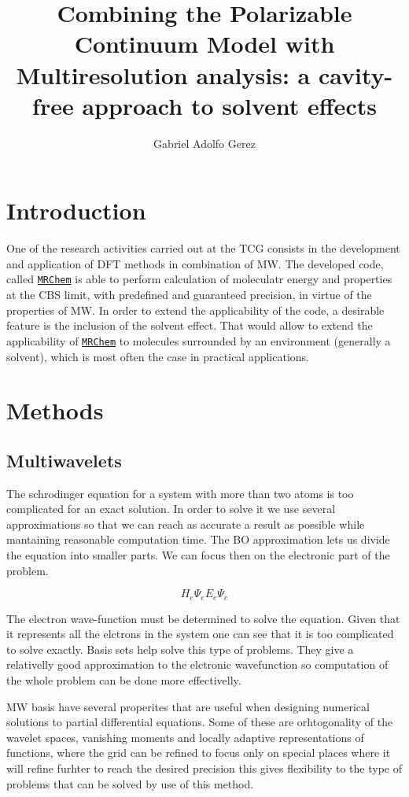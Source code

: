 \documentclass[a4paper,11pt]{article}
\title{Combining the Polarizable Continuum Model with Multiresolution
  analysis: a cavity-free approach to solvent effects}
\author{Gabriel Adolfo Gerez}
\newcommand{\mrchem}{\href{https://mrchem.readthedocs.io/en/latest/}{\texttt{MRChem}}}
\begin{document}
\maketitle

\section{Introduction}

One of the research activities carried out at the \ac{TCG} consists in
the development and application of \ac{DFT} methods in combination of
\ac{MW}. The developed code, called \mrchem{} is able to perform calculation of
moleculatr energy and properties at the \ac{CBS} limit, with
predefined and guaranteed precision, in virtue of the properties of
\ac{MW}. In order to extend the applicability of the code, a desirable
feature is the inclusion of the solvent effect. That would allow to
extend the applicability of \mrchem{} to molecules surrounded by an
environment (generally a solvent), which is most often the case in
practical applications.

\section{Methods}

\subsection{Multiwavelets}
The schrodinger equation for a system with more than two atoms is too complicated for an exact solution. In order to solve it we use several approximations so that we can reach as accurate a result as possible while mantaining reasonable computation time.
The \ac{BO} approximation lets us divide the equation into smaller parts. We can focus then on the electronic part of the problem.

\begin{equation}
H_e \Psi_e E_e \Psi_e
\end{equation}

 The electron wave-function must be determined to solve the equation. Given that it represents all the elctrons in the system one can see that it is too complicated to solve exactly. Basis sets help solve this type of problems. They give a relativelly good approximation to the elctronic wavefunction so computation of the whole problem can be done more effectivelly.
 

\ac{MW} basis have several properites that are useful when designing numerical solutions to partial differential equations. Some of these are orhtogonality of the wavelet spaces, vanishing moments
and locally adaptive representations of functions, where the grid can be refined to focus only on special places where it will refine furhter to reach the desired precision %
this gives flexibility to the type of problems that can be solved by use of this method.
\end{document}
